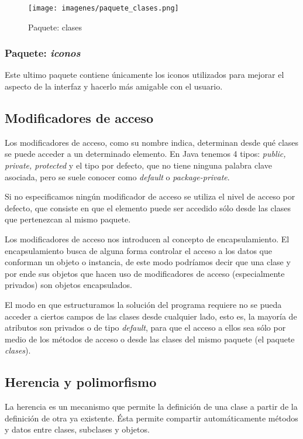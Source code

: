 \documentclass[12pt]{article}
\begin{document}
\begin{figure}[H]
\centering
\texttt{[image: imagenes/paquete\_clases.png]}
\caption{Paquete: clases}
\end{figure} 

\subsubsection{Paquete: \textit{iconos}}
Este ultimo paquete contiene únicamente los iconos utilizados para mejorar el aspecto de la interfaz y hacerlo más amigable con el usuario.

\subsection{Modificadores de acceso}
Los modificadores de acceso, como su nombre indica, determinan desde qué clases se puede acceder a un determinado elemento. En Java tenemos 4 tipos:\textit{ public, private, protected} y el tipo por defecto, que no tiene ninguna palabra clave asociada, pero se suele conocer como \textit{default} o \textit{package-private}.

\par Si no especificamos ningún modificador de acceso se utiliza el nivel de acceso por defecto, que consiste en que el elemento puede ser accedido sólo desde las clases que pertenezcan al mismo paquete.

\par Los modificadores de acceso nos introducen al concepto de encapsulamiento. El encapsulamiento busca de alguna forma controlar el acceso a los datos que conforman un objeto o instancia, de este modo podríamos decir que una clase y por ende sus objetos que hacen uso de modificadores de acceso (especialmente privados) son objetos encapsulados.\\

\par El modo en que estructuramos la solución del programa requiere no se pueda acceder a ciertos campos de las clases desde cualquier lado, esto es, la mayoría de atributos son privados o de tipo \textit{default}, para que el acceso a ellos sea sólo por medio de los métodos de acceso o desde las clases del mismo paquete (el paquete \textit{clases}).

\subsection{Herencia y polimorfismo}
La herencia es un mecanismo que permite la definición de una clase a partir de la definición de otra ya existente. Ésta permite compartir automáticamente métodos y datos entre clases, subclases y objetos.
\end{document}
